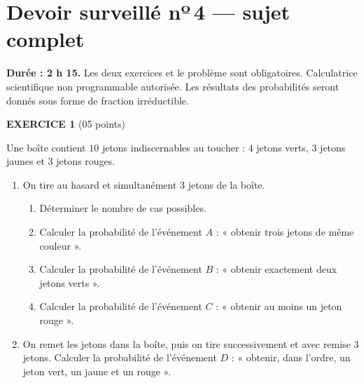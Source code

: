 \chapter*{Devoir surveillé nº\,4 — sujet complet}

\begin{devoirsurveille}
\textbf{Durée : 2 h 15.} Les deux exercices et le problème sont obligatoires.
Calculatrice scientifique non programmable autorisée. Les résultats des
probabilités seront donnés sous forme de fraction irréductible.

\vspace{0.7em}
\noindent\textbf{\sffamily EXERCICE 1} \hfill \textup{(05 points)}

Une boîte contient $10$ jetons indiscernables au toucher : $4$ jetons verts,
$3$ jetons jaunes et $3$ jetons rouges.

\begin{enumerate}[label=\textbf{\arabic*.}, leftmargin=*, itemsep=0.25em]
  \item On tire au hasard et simultanément $3$ jetons de la boîte.
    \begin{enumerate}[label=\textbf{\alph*)}, leftmargin=1.4em, itemsep=0.15em]
      \item Déterminer le nombre de cas possibles. 
      \item Calculer la probabilité de l'événement
            $A$ : « obtenir trois jetons de même couleur ». 
      \item Calculer la probabilité de l'événement
            $B$ : « obtenir exactement deux jetons verts ». 
      \item Calculer la probabilité de l'événement
            $C$ : « obtenir au moins un jeton rouge ». 
    \end{enumerate}
  \item On remet les jetons dans la boîte, puis on tire successivement et
        avec remise $3$ jetons. Calculer la probabilité de l'événement
        $D$ : « obtenir, dans l'ordre, un jeton vert, un jaune et un rouge ».
\end{enumerate}


\end{devoirsurveille}
